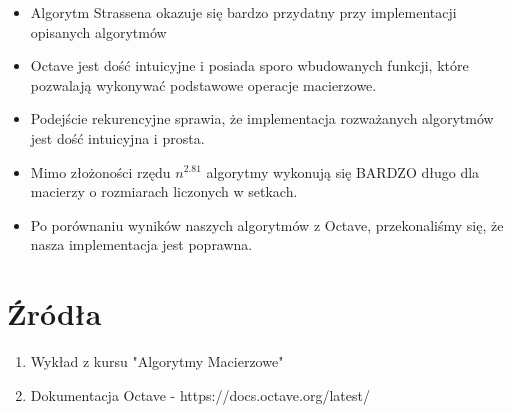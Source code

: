 \documentclass{article}
\begin{document}
\begin{itemize}
    \item Algorytm Strassena okazuje się bardzo przydatny przy implementacji opisanych algorytmów
    \item Octave jest dość intuicyjne i posiada sporo wbudowanych funkcji, które pozwalają wykonywać podstawowe operacje macierzowe.
    \item Podejście rekurencyjne sprawia, że implementacja rozważanych algorytmów jest dość intuicyjna i prosta.
    \item Mimo złożoności rzędu \(n^{2.81}\) algorytmy wykonują się BARDZO długo dla macierzy o rozmiarach liczonych w setkach.
    \item Po porównaniu wyników naszych algorytmów z Octave, przekonaliśmy się, że nasza implementacja jest poprawna.
\end{itemize}

\section{Źródła}

\begin{enumerate}
    \item Wykład z kursu "Algorytmy Macierzowe"
    \item Dokumentacja Octave - https://docs.octave.org/latest/
\end{enumerate}
\end{document}
